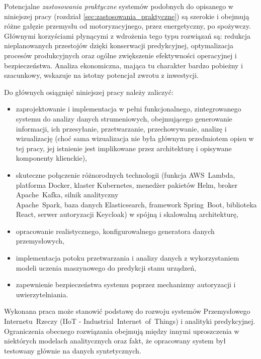 Potencjalne \textit{zastosowania praktyczne} systemów podobnych do opisanego w niniejszej pracy (rozdział \ref{sec:zastosowania_praktyczne}) są szerokie i obejmują różne gałęzie przemysłu od motoryzacyjnego, przez energetyczny, po spożywczy. Głównymi korzyściami płynącymi z wdrożenia tego typu rozwiązań są: redukcja nieplanowanych przestojów dzięki konserwacji predykcyjnej, optymalizacja procesów produkcyjnych oraz ogólne zwiększenie efektywności operacyjnej i bezpieczeństwa. Analiza ekonomiczna, mająca tu charakter bardzo pobieżny i szacunkowy, wskazuje na istotny potencjał zwrotu z inwestycji.

\vspace{0.3em}

Do głównych osiągnięć niniejszej pracy należy zaliczyć:
\begin{itemize}
    \item zaprojektowanie i implementacja w pełni funkcjonalnego, zintegrowanego systemu do analizy danych  strumeniowych, obejmującego generowanie informacji, ich przesyłanie, przetwarzanie, przechowywanie, analizę i wizualizację (choć sama wizualizacja nie była głównym przedmiotem opisu w tej pracy, jej istnienie jest implikowane przez architekturę i opisywane komponenty klienckie),
    \item skuteczne połączenie różnorodnych technologii (funkcja \mbox{AWS Lambda}, platforma Docker, klaster Kubernetes, menedżer pakietów Helm, broker \mbox{Apache Kafka}, silnik analityczny \\ \mbox{Apache Spark}, baza danych Elasticsearch, framework \mbox{Spring Boot}, biblioteka React, serwer autoryzacji Keycloak) w spójną i skalowalną architekturę,
    \item opracowanie realistycznego, konfigurowalnego generatora danych przemysłowych,
    \item implementacja potoku przetwarzania i analizy danych z wykorzystaniem modeli uczenia maszynowego do predykcji stanu urządzeń,
    \item zapewnienie bezpieczeństwa systemu poprzez mechanizmy autoryzacji i uwierzytelniania.
\end{itemize}

\vspace{0.3em}

Wykonana praca może stanowić podstawę do rozwoju systemów Przemysłowego \mbox{Internetu Rzeczy} (\mbox{IIoT} - \mbox{Industrial Internet of Things}) i analityki predykcyjnej. Ograniczenia obecnego rozwiązania obejmują między innymi uproszczenia w niektórych modelach analitycznych oraz fakt, że opracowany system był testowany głównie na danych syntetycznych. 

